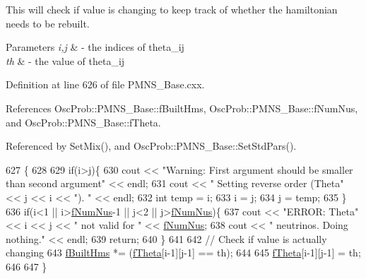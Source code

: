 This will check if value is changing to keep track of whether the hamiltonian needs to be rebuilt.


\begin{DoxyParams}{Parameters}
{\em i,j} & -\/ the indices of theta\+\_\+ij \\
\hline
{\em th} & -\/ the value of theta\+\_\+ij \\
\hline
\end{DoxyParams}


Definition at line 626 of file P\+M\+N\+S\+\_\+\+Base.\+cxx.



References Osc\+Prob\+::\+P\+M\+N\+S\+\_\+\+Base\+::f\+Built\+Hms, Osc\+Prob\+::\+P\+M\+N\+S\+\_\+\+Base\+::f\+Num\+Nus, and Osc\+Prob\+::\+P\+M\+N\+S\+\_\+\+Base\+::f\+Theta.



Referenced by Set\+Mix(), and Osc\+Prob\+::\+P\+M\+N\+S\+\_\+\+Base\+::\+Set\+Std\+Pars().


\begin{DoxyCode}
627 \{
628 
629   \textcolor{keywordflow}{if}(i>j)\{
630     cout << \textcolor{stringliteral}{"Warning: First argument should be smaller than second argument"} << endl;
631     cout << \textcolor{stringliteral}{"         Setting reverse order (Theta"} << j << i << \textcolor{stringliteral}{"). "} << endl;
632     \textcolor{keywordtype}{int} temp = i;
633     i = j;
634     j = temp;
635   \}
636   \textcolor{keywordflow}{if}(i<1 || i>\hyperlink{classOscProb_1_1PMNS__Base_a24bb74bed63569dfe88b18fa6a08060e}{fNumNus}-1 || j<2 || j>\hyperlink{classOscProb_1_1PMNS__Base_a24bb74bed63569dfe88b18fa6a08060e}{fNumNus})\{
637     cout << \textcolor{stringliteral}{"ERROR: Theta"} << i << j << \textcolor{stringliteral}{" not valid for "} << \hyperlink{classOscProb_1_1PMNS__Base_a24bb74bed63569dfe88b18fa6a08060e}{fNumNus};
638     cout << \textcolor{stringliteral}{" neutrinos. Doing nothing."} << endl;
639     \textcolor{keywordflow}{return};
640   \}
641 
642   \textcolor{comment}{// Check if value is actually changing}
643   \hyperlink{classOscProb_1_1PMNS__Base_a9ac3cadeac8db1b90f3152f476244780}{fBuiltHms} *= (\hyperlink{classOscProb_1_1PMNS__Base_a1976887cd658dd86b2336c181f1470b4}{fTheta}[i-1][j-1] == th);
644 
645   \hyperlink{classOscProb_1_1PMNS__Base_a1976887cd658dd86b2336c181f1470b4}{fTheta}[i-1][j-1] = th;
646 
647 \}
\end{DoxyCode}
\mbox{\label{classOscProb_1_1PMNS__Base_aba565962a440d14bee7a2a96d2eca2c5}} 
